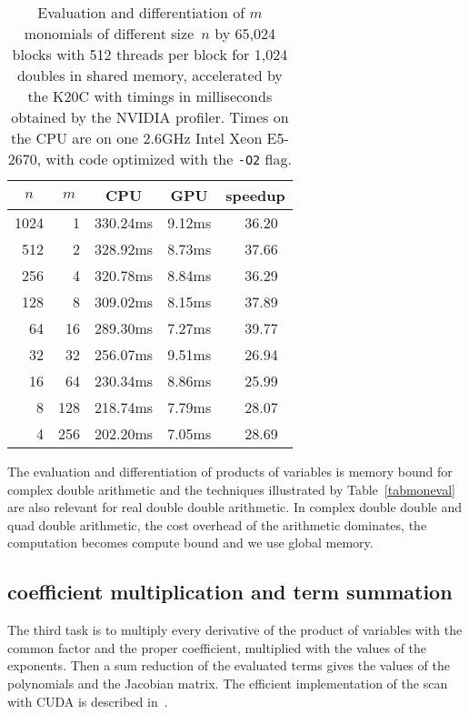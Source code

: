 \documentclass{article}
\begin{document}
\begin{table}[bh]
\begin{center}
\caption{Evaluation and differentiation of $m$ monomials 
of different size~$n$
by 65,024 blocks with 512 threads per block for 1,024 doubles in shared
memory, accelerated by the K20C with timings in milliseconds obtained by
the NVIDIA profiler. 
Times on the CPU are on one 2.6GHz Intel Xeon E5-2670,
with code optimized with the {\tt -O2} flag.}
\label{tabmoneval2}
\begin{tabular}{r| r| r r| r }
\multicolumn{1}{c|}{$n$} & \multicolumn{1}{c|}{$m$}
&  \multicolumn{1}{c}{CPU} & \multicolumn{1}{c|}{GPU}  & speedup \\ \hline
1024   &   1  & 330.24ms  & 9.12ms & 36.20~ \\
 512   &   2  & 328.92ms  & 8.73ms & 37.66~ \\
 256   &   4  & 320.78ms  & 8.84ms & 36.29~ \\ 
 128   &   8  & 309.02ms  & 8.15ms & 37.89~ \\
  64   &  16  & 289.30ms  & 7.27ms & 39.77~ \\
  32   &  32  & 256.07ms  & 9.51ms & 26.94~ \\
  16   &  64  & 230.34ms  & 8.86ms & 25.99~ \\ 
   8   & 128  & 218.74ms  & 7.79ms & 28.07~ \\ 
   4   & 256  & 202.20ms  & 7.05ms & 28.69~ \\
\end{tabular}
\end{center}
\end{table}

The evaluation and differentiation of products of variables
is memory bound for complex double arithmetic and the techniques illustrated
by Table~\ref{tabmoneval} are also relevant 
for real double double arithmetic.
In complex double double and quad double arithmetic, 
the cost overhead of the arithmetic
dominates, the computation becomes compute bound and we use global memory.

\subsection{coefficient multiplication and term summation}

The third task is to multiply every derivative of the product
of variables with the common factor and the proper coefficient,
multiplied with the values of the exponents.
Then a sum reduction of the evaluated terms gives the
values of the polynomials and the Jacobian matrix.
The efficient implementation of the scan with CUDA
is described in~\cite{Harris2}.
\end{document}
